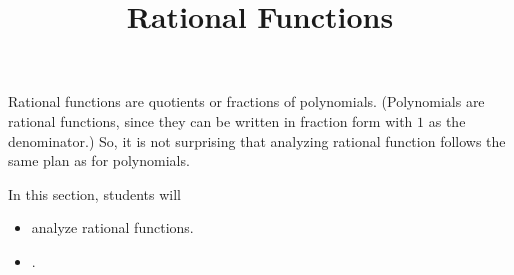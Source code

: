 \documentclass{ximera}
\title{Rational Functions}
\begin{document}
\begin{abstract}
\end{abstract}
\maketitle












Rational functions are quotients or fractions of polynomials.  (Polynomials are rational functions, since they can be written in fraction form with $1$ as the denominator.)  So, it is not surprising that analyzing rational function follows the same plan as for polynomials.




























\begin{sectionOutcomes}
In this section, students will 

\begin{itemize}
\item analyze rational functions.
\item .
\end{itemize}
\end{sectionOutcomes}
\end{document}

